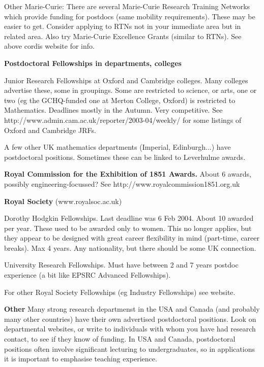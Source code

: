 \smallskip

Other Marie-Curie:  There are several Marie-Curie Research Training Networks which provide 
funding for postdocs 
(same mobility requirements). These may be easier to get. Consider applying to RTNs not in your
 immediate area but in related area. Also try Marie-Curie Excellence Grants (similar to RTNs).
See above cordis website for info.

\medskip

{\bf Postdoctoral Fellowships in departments, colleges}


 Junior Research Fellowships at Oxford and Cambridge colleges. Many colleges advertise these,
 some in groupings.
Some are restricted to science, or arts, one or two (eg the GCHQ-funded one at Merton College, Oxford)
 is restricted to Mathematics.
Deadlines mostly in the Autumn. Very competitive. See
http://www.admin.cam.ac.uk/reporter/2003-04/weekly/
for some listings of Oxford and Cambridge JRFs.

\smallskip

A few other UK mathematics departments (Imperial, Edinburgh...) have postdoctoral positions. 
Sometimes these
 can be linked to Leverhulme
awards.

\medskip


{\bf Royal Commission for the Exhibition of 1851 Awards.}  About 6 awards,
 possibly engineering-focussed? See
http://www.royalcommission1851.org.uk

\medskip



{\bf Royal Society} (www.royalsoc.ac.uk)

\smallskip

Dorothy Hodgkin Fellowships. Last deadline was 6 Feb 2004. About 10 awarded per year. These 
used to be
awarded only to women. This no longer applies, but they appear to be designed with great
 career flexibility in mind
(part-time, career breaks). Max 4 years. Any nationality, but there should be some UK connection. 

\smallskip

University Research Fellowships. Must have between 2 and 7 years postdoc experience
 (a bit like EPSRC Advanced Fellowships).

For other Royal Society Fellowships (eg Industry Fellowships) see website.

\medskip


{\bf Other}
Many  strong research departmenst in the USA and Canada (and probably many other countries)
have their own advertised postdoctoral positions. Look on departmental websites, or write
 to individuals with whom you have had research contact, to see if they 
know of funding. In USA and Canada, postdoctoral positions often involve significant 
lecturing to undergraduates, so in applications
it is important to emphasise teaching experience.

